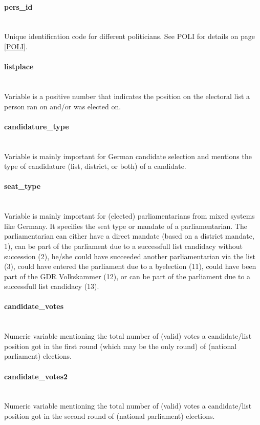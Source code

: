 \documentclass{article}
\begin{document}
\paragraph{pers\_id}\\
    Unique identification code for different politicians. See POLI for details on page \ref{POLI}.

\paragraph{listplace}\\
    Variable is a positive number that indicates the position on the electoral list a person ran on and/or was elected on.

\paragraph{candidature\_type}\\
    Variable is mainly important for German candidate selection and mentions the type of candidature (list, district, or both) of a candidate.
    
\paragraph{seat\_type}\\
   Variable is mainly important for (elected) parliamentarians from mixed systems like Germany. It specifies the seat type or mandate of a parliamentarian. The parliamentarian can either have a direct mandate (based on a district mandate, 1), can be part of the parliament due to a successfull list candidacy without succession (2), he/she could have succeeded another parliamentarian via the list (3), could have entered the parliament due to a byelection (11), could have been part of the GDR Volkskammer (12), or can be part of the parliament due to a successfull list candidacy (13).
    
\paragraph{candidate\_votes}\\
   Numeric variable mentioning the total number of (valid) votes a candidate/list position got in the first round (which may be the only round) of (national parliament) elections.
   
\paragraph{candidate\_votes2}\\
   Numeric variable mentioning the total number of (valid) votes a candidate/list position got in the second round of (national parliament) elections.
    
\end{document}

